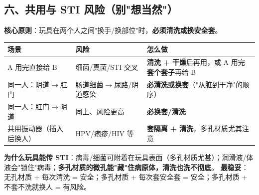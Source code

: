 \documentclass[12pt,UTF8,openany]{ctexbook}
\begin{document}
\subsection*{六、共用与 STI 风险（别"想当然"）}
\textbf{核心原则}：玩具在两个人之间"换手/换部位"时，\textbf{必须清洗或换安全套}。
\begin{tabularx}{\textwidth}{X X X}
\toprule
\textbf{场景} & \textbf{风险} & \textbf{怎么做} \\
\midrule
A 用完直接给 B & 细菌/真菌/STI 交叉 & \textbf{清洗 + 干燥}后再用，或 A 用完\textbf{套个套子}再给 B \\
同一人：阴道$\to$肛门 & 肠道细菌$\to$尿路/阴道感染 & \textbf{必清洗或换套}（"从脏到干净"的顺序） \\
同一人：肛门$\to$阴道 & 同上、风险更高 & \textbf{必换套/清洗} \\
共用振动器（插入后换人） & HPV/疱疹/HIV 等 & \textbf{套隔离 + 清洗}，多孔材质尤其注意 \\
\bottomrule
\end{tabularx}
\par\smallskip
\textbf{为什么玩具能传 STI}：病毒/细菌可附着在玩具表面（多孔材质尤甚）；润滑液/体液会"锁住"病毒；\textbf{多孔材质的微孔能"藏"住病原体，清洗也洗不彻底}。
\textbf{最稳妥}：无孔材质 + 每次清洗 = 安全；多孔材质 + 每次套安全套 = 安全；多孔材质 + 不套不洗就换人 = 有风险。
\end{document}
